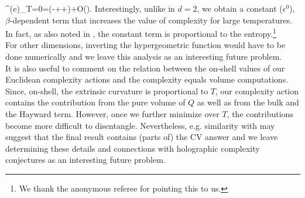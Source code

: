 \documentclass[a4paper,12pt]{article}
\begin{document}
\be
{}^{(e)}_{T=0}=\left(-++\right)+O(\epsilon).
\ee
Interestingly, unlike in $d=2$, we obtain a constant ($\epsilon^0$), $\beta$-dependent term that increases the value of complexity for large temperatures. In fact, as also noted in \cite{Chapman:2016hwi}, the constant term is proportional to the entropy.\footnote{We thank the anonymous referee for pointing this to us.} \\
For other dimensions, inverting the hypergeometric function would have to be done numerically and we leave this analysis as an interesting future problem.\\
It is also useful to comment on the relation between the on-shell values of our Euclidean complexity actions and the complexity equals volume \cite{Susskind} computations. Since, on-shell, the extrinsic curvature is proportional to $T$, our complexity action contains the contribution from the pure volume of $Q$ as well as from the bulk and the Hayward term. However, once we further minimize over $T$, the contributions become more difficult to disentangle. Nevertheless, e.g. similarity with \cite{Chapman:2016hwi} may suggest that the final result contains (parts of) the CV answer and we leave determining these details and connections with holographic complexity conjectures as an interesting future problem.
\end{document}
